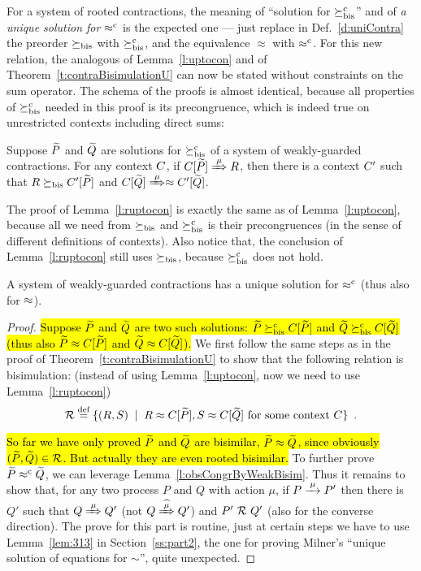 For a system of rooted contractions, the meaning of 
``solution for $\mathrel{\succeq^{\rm{c}}_{\rm{bis}}}$'' and of \emph{a unique solution for $\mathrel{\approx^{\rm{c}}}$}
is the expected one --- just replace in Def.~\ref{d:uniContra}  the preorder 
$\mathrel{\succeq_{\rm{bis}}}$ with $\mathrel{\succeq^{\rm{c}}_{\rm{bis}}}$, and the equivalence 
$\approx$ with $\mathrel{\approx^{\rm{c}}}$.
%
For this new relation, the analogous of Lemma~\ref{l:uptocon} and of
Theorem~\ref{t:contraBisimulationU} can now be stated without constraints on the sum
operator.
The schema of the proofs is almost identical, because all 
properties of $\mathrel{\succeq^{\rm{c}}_{\rm{bis}}}$ needed in this proof is its precongruence, which is
indeed true on unrestricted contexts including direct sums:
\begin{lemma}
\label{l:ruptocon}
Suppose $\widetilde P$ and $\widetilde Q$ are solutions  for $\mathrel{\succeq^{\rm{c}}_{\rm{bis}}}$ 
 of a system of weakly-guarded
contractions.
For any context $C$, 
if  $\ct{\til P}\Arr{\mu}  R$,
 then 
there is a  context $C'$
such that $R \mathrel{\succeq_{\rm{bis}}} C' [\widetilde P]$ and  $\ct{\til Q} \Arr{\mu}
 \wb \ctp{\til Q}$.
\end{lemma}
The proof of Lemma~\ref{l:ruptocon} is exactly the same as of
Lemma~\ref{l:uptocon}, because all we need from $\mathrel{\succeq_{\rm{bis}}}$ and
$\mathrel{\succeq^{\rm{c}}_{\rm{bis}}}$ is their precongruences (in the sense of different
definitions of contexts). Also notice that, the conclusion of
Lemma~\ref{l:ruptocon} still uses $\mathrel{\succeq_{\rm{bis}}}$, because $\mathrel{\succeq^{\rm{c}}_{\rm{bis}}}$ does
not hold.

\begin{theorem}
\label{t:rcontraBisimulationU}
A system of weakly-guarded contractions has a unique solution 
 for $\mathrel{\approx^{\rm{c}}}$ (thus also for $\approx$).
\end{theorem} 

\begin{proof}
\hl{Suppose $\widetilde P$ and $\widetilde Q$ are two such solutions: $\widetilde P \mathrel{\succeq^{\rm{c}}_{\rm{bis}}}
C[{\widetilde P}]$ and $\widetilde Q \mathrel{\succeq^{\rm{c}}_{\rm{bis}}} C[{\widetilde Q}]$ (thus also $\widetilde P \approx
C[{\widetilde P}]$ and $\widetilde Q \approx C[{\widetilde Q}]$).} We first follow the same steps as in the proof of
Theorem~\ref{t:contraBisimulationU} to show that the following
relation is bisimulation: (instead of using Lemma~\ref{l:uptocon}, now we need to use
Lemma~\ref{l:ruptocon})
\begin{equation}
\label{eq:R2}
{\cal R} \stackrel{\mbox{\scriptsize def}}{=} \{ 
(R,S) \; \mid \; R \approx C [\widetilde P], S \approx C [\widetilde Q] \mbox{ for some context
$C$} \} \enspace.
\end{equation}

\hl{So far we have only proved $\widetilde P$ and $\widetilde Q$ are bisimilar,
  $\widetilde P \approx \widetilde Q$, since obviously $(\widetilde P,\widetilde Q)
\in {\cal R}$. But actually they are even rooted bisimilar.} To further prove
$\widetilde P \mathrel{\approx^{\rm{c}}} \widetilde Q$, we can leverage
Lemma~\ref{l:obsCongrByWeakBisim}. Thus it remains to show that, for 
any two process $P$ and $Q$ with action $\mu$, if $P \arr{\mu} P'$ then
there is $Q'$ such that $Q \Arr{\mu} Q'$ (not $Q \Arcap{\mu} Q'$) and
$P'\ {\cal R}\ Q'$ (also for the converse direction).  The prove for this
part is routine, just at certain steps we have to use
Lemma~\ref{lem:313} in Section~\ref{ss:part2}, the
one for proving Milner's ``unique solution of equations for $\sim$'',
quite unexpected.
\end{proof}
